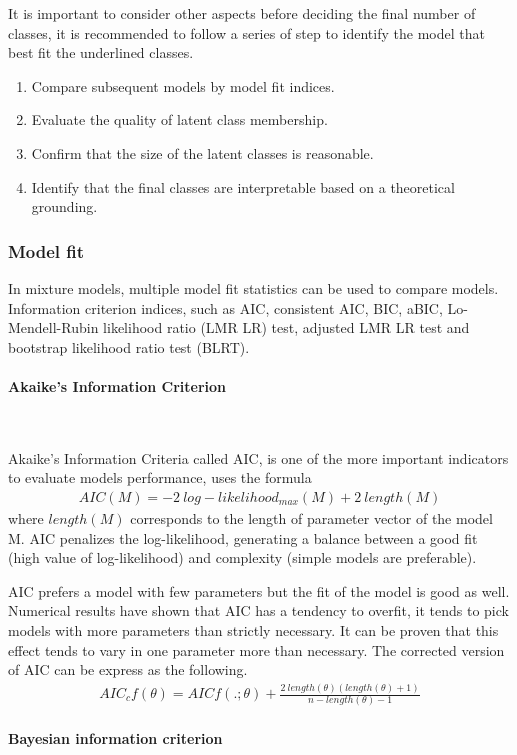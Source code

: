 \documentclass[12pt,a4paper,oneside]{reedthesis}
\providecommand{\tightlist}{%
  \setlength{\itemsep}{0pt}\setlength{\parskip}{0pt}}
\begin{document}
It is important to consider other aspects before deciding the final number of classes, it is recommended to follow a series of step to identify the model that best fit the underlined classes.
\begin{enumerate}
\def\labelenumi{\alph{enumi})}
\tightlist
\item
  Compare subsequent models by model fit indices.\\
\item
  Evaluate the quality of latent class membership.\\
\item
  Confirm that the size of the latent classes is reasonable.\\
\item
  Identify that the final classes are interpretable based on a theoretical grounding.
\end{enumerate}
\hypertarget{model-fit}{%
\subsubsection{Model fit}\label{model-fit}}

In mixture models, multiple model fit statistics can be used to compare models. Information criterion indices, such as AIC, consistent AIC, BIC, aBIC, Lo-Mendell-Rubin likelihood ratio (LMR LR) test, adjusted LMR LR test and bootstrap likelihood ratio test (BLRT).

\hypertarget{akaikes-information-criterion}{%
\paragraph{Akaike's Information Criterion}\label{akaikes-information-criterion}}

~

Akaike's Information Criteria called AIC, is one of the more important indicators to evaluate models performance, uses the formula
\begin{align}
AIC(M) = -2 \: log-likelihood_{max}(M) + 2 \:length(M)
\end{align}
where \(length(M)\) corresponds to the length of parameter vector of the model M. AIC penalizes the log-likelihood, generating a balance between a good fit (high value of log-likelihood) and complexity (simple models are preferable).

AIC prefers a model with few parameters but the fit of the model is good as well. Numerical results have shown that AIC has a tendency to overfit, it tends to pick models with more parameters than strictly necessary. It can be proven that this effect tends to vary in one parameter more than necessary. The corrected version of AIC can be express as the following.
\begin{align}
AIC_c{f(\theta)} = AIC{f(.;\theta)} + \frac{2 \: length(\theta)(length(\theta)+1)}{n-length(\theta) - 1}
\end{align}
\hypertarget{bayesian-information-criterion}{%
\paragraph{Bayesian information criterion}\label{bayesian-information-criterion}}
\end{document}
